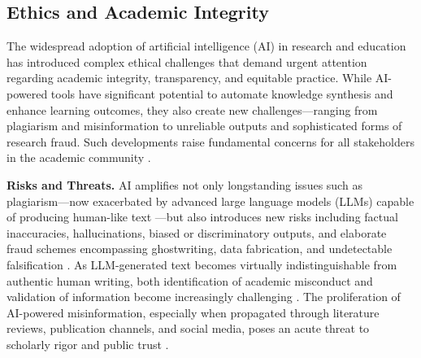 \subsection{Ethics and Academic Integrity}

The widespread adoption of artificial intelligence (AI) in research and education has introduced complex ethical challenges that demand urgent attention regarding academic integrity, transparency, and equitable practice. While AI-powered tools have significant potential to automate knowledge synthesis and enhance learning outcomes, they also create new challenges—ranging from plagiarism and misinformation to unreliable outputs and sophisticated forms of research fraud. Such developments raise fundamental concerns for all stakeholders in the academic community \cite{ref2,ref4,ref7,ref9,ref10,ref13,ref14,ref15,ref23,ref24,ref39,ref40,ref41,ref45,ref51,ref53,ref64,ref65,ref66,ref70,ref76,ref80,ref81,ref82,ref83,ref84,ref85,ref89,ref90,ref91,ref92,ref93,ref94,ref95,ref96,ref97,ref98,ref109,ref110,ref73,ref86,ref100}.

\textbf{Risks and Threats.}
AI amplifies not only longstanding issues such as plagiarism—now exacerbated by advanced large language models (LLMs) capable of producing human-like text \cite{ref2,ref24,ref53,ref81,ref90,ref92,ref95,ref97}—but also introduces new risks including factual inaccuracies, hallucinations, biased or discriminatory outputs, and elaborate fraud schemes encompassing ghostwriting, data fabrication, and undetectable falsification \cite{ref4,ref9,ref14,ref39,ref40,ref45,ref66,ref70,ref76,ref80,ref84,ref86,ref91,ref93,ref109}. As LLM-generated text becomes virtually indistinguishable from authentic human writing, both identification of academic misconduct and validation of information become increasingly challenging \cite{ref14,ref24,ref80,ref85,ref92,ref97,ref110}. The proliferation of AI-powered misinformation, especially when propagated through literature reviews, publication channels, and social media, poses an acute threat to scholarly rigor and public trust \cite{ref15,ref39,ref41,ref64,ref85,ref98}.

